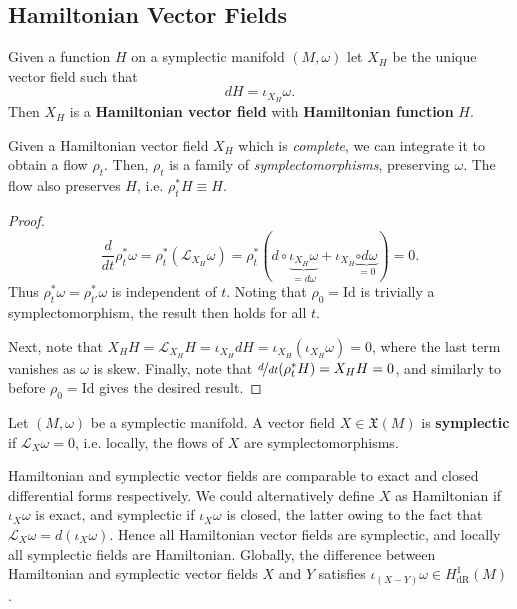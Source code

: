 \documentclass[11pt, final]{article}
\begin{document}
\subsection{Hamiltonian Vector Fields}

\begin{definition}
	Given a function $H$ on a symplectic manifold $(M,\omega)$ let $X_H$ be the unique vector field such that
		\begin{equation}
			dH = \iota_{X_H} \omega.
		\end{equation}
	Then $X_H$ is a \textbf{Hamiltonian vector field} with \textbf{Hamiltonian function} $H$.
\end{definition}

\begin{prop}
	Given a Hamiltonian vector field $X_H$ which is \textit{complete}, we can integrate it to obtain a flow $\rho_t$. Then, $\rho_t$ is a family of \textit{symplectomorphisms}, preserving $\omega$. The flow also preserves $H$, i.e. $\rho_t^* H \equiv H$.
\end{prop}
\begin{proof}
	\begin{equation}
		\frac{d}{dt} \rho^*_t \omega = \rho^*_t(\mathcal{L}_{X_H} \omega) = \rho^*_t \left( d \circ \underbrace{\iota_{X_H} \omega}_{=d\omega} + \iota_{X_H} \underbrace{\circ d \omega}_{=0} \right) = 0.
	\end{equation}
	Thus $\rho^*_t \omega = \rho^*_{t'} \omega$ is independent of $t$. Noting that $\rho_0 = \mathrm{Id}$ is trivially a symplectomorphism, the result then holds for all $t$.
	
	Next, note that $X_H H = \mathcal{L}_{X_H} H = \iota_{X_H} dH = \iota_{X_H} ( \iota_{X_H} \omega ) = 0$, where the last term vanishes as $\omega$ is skew. Finally, note that $\nicefrac{d}{dt} (\rho^*_t H) = X_H H = 0$, and similarly to before $\rho_0 = \mathrm{Id}$ gives the desired result.
\end{proof}

\begin{definition}
	Let $(M,\omega)$ be a symplectic manifold. A vector field $X \in \mathfrak{X}(M)$ is \textbf{symplectic} if $\mathcal{L}_X \omega = 0$, i.e. locally, the flows of $X$ are symplectomorphisms.
\end{definition}

\begin{remark}
	Hamiltonian and symplectic vector fields are comparable to exact and closed differential forms respectively. We could alternatively define $X$ as Hamiltonian if $\iota_X \omega$ is exact, and symplectic if $\iota_X \omega$ is closed, the latter owing to the fact that $\mathcal{L}_X \omega = d (\iota_X \omega)$. Hence all Hamiltonian vector fields are symplectic, and locally all symplectic fields are Hamiltonian. Globally, the difference between Hamiltonian and symplectic vector fields $X$ and $Y$ satisfies $\iota_{(X-Y)} \omega \in H^1_{\mathrm{dR}}(M)$.
\end{remark}
\end{document}
